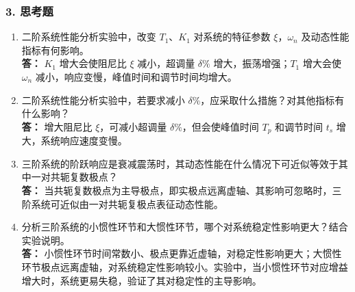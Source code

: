 \documentclass[12pt,a4paper,UTF8]{ctexart}
\begin{document}
\subsubsection{3. 思考题}
\begin{enumerate}[leftmargin=*]
    \item 二阶系统性能分析实验中，改变 $T_1$、$K_1$ 对系统的特征参数 $\xi$，$\omega_n$ 及动态性能指标有何影响。\\
\textbf{答：} $K_1$ 增大会使阻尼比 $\xi$ 减小，超调量 $\delta\%$ 增大，振荡增强；$T_1$ 增大会使 $\omega_n$ 减小，响应变慢，峰值时间和调节时间均增大。

    \item 二阶系统性能分析实验中，若要求减小 $\delta\%$，应采取什么措施？对其他指标有什么影响？\\
\textbf{答：} 增大阻尼比 $\xi$，可减小超调量 $\delta\%$，但会使峰值时间 $T_p$ 和调节时间 $t_s$ 增大，系统响应速度变慢。

    \item 三阶系统的阶跃响应是衰减震荡时，其动态性能在什么情况下可近似等效于其中一对共轭复数极点？\\
\textbf{答：} 当共轭复数极点为主导极点，即实极点远离虚轴、其影响可忽略时，三阶系统可近似由一对共轭复极点表征动态性能。

    \item 分析三阶系统的小惯性环节和大惯性环节，哪个对系统稳定性影响更大？结合实验说明。\\
\textbf{答：} 小惯性环节时间常数小、极点更靠近虚轴，对稳定性影响更大；大惯性环节极点远离虚轴，对系统稳定性影响较小。实验中，当小惯性环节对应增益增大时，系统更易失稳，验证了其对稳定性的主导影响。
\end{enumerate}
\end{document}
